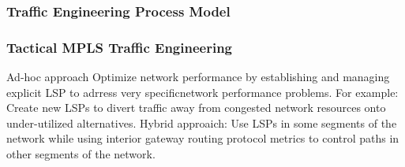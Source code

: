 \documentclass[12pt]{beamer}
\begin{document}
\begin{frame}
\frametitle{Traffic Engineering Process Model}
\end{frame}

\begin{frame}
\frametitle{Tactical MPLS Traffic Engineering}
    Ad-hoc approach
    Optimize network performance by establishing and managing explicit LSP to adrress very specificnetwork performance problems.
    For example: Create new LSPs to divert traffic away from congested network resources onto under-utilized alternatives.
    Hybrid approaich: Use LSPs in some segments of the network while using interior gateway routing protocol metrics to control paths in other segments of the network.
\end{frame}

\end{document}
